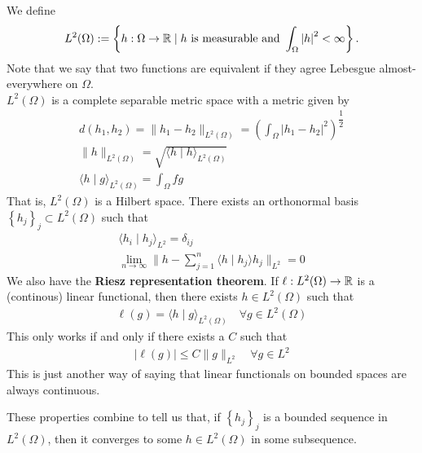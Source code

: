 \documentclass{memoir}
\begin{document}
\begin{rmrk}
	We define
	\begin{align*}
		L^2(\Omega ) := \left\{h: \Omega \to \mathbb{R} \mid h \text{ is measurable and } \int_\Omega \left| h \right|^2 < \infty\right\} .
	\end{align*}
	Note that we say that two functions are equivalent if they agree Lebesgue almost-everywhere on \(\Omega \).\\

	\(L^2(\Omega )\) is a complete separable metric space with a metric given by
	\begin{align*}
		d(h_1,h_2) = \|h_1 - h_2\|_{L^2(\Omega )} = \left( \int_\Omega \left| h_1 - h_2 \right|^2 \right)^{ \dfrac{1}{2}}\\
		\|h\|_{L^2(\Omega )} = \sqrt{ \langle h \mid h \rangle_{L^2(\Omega )}} \\
		\langle h \mid g \rangle_{L^2(\Omega )} = \int_\Omega fg
	\end{align*}
	That is, \(L^2(\Omega )\) is a Hilbert space. There exists an orthonormal basis \(\left\{ h_j \right\}_j \subset L^2(\Omega )\) such that
	\begin{align*}
		\langle h_i \mid h_j \rangle_{L^2} = \delta_{ij}\\
		\lim_{n \to \infty} \|h - \sum_{j=1}^{n} \langle h \mid h_j \rangle h_j\|_{L^2} = 0
	\end{align*}
	We also have the \textbf{Riesz representation theorem}. If \(\ell:L^2(\Omega ) \to \mathbb{R}\) is a (continous) linear functional, then there exists \(h \in L^2(\Omega )\) such that
	\begin{align*}
		\ell(g) = \langle h\mid g \rangle_{L^2(\Omega )} \quad \forall g \in L^2(\Omega )
	\end{align*}
	This only works if and only if there exists a \(C\) such that
	\begin{align*}
		\left| \ell(g) \right| \leq C \|g\|_{L^2}\quad \forall g \in L^2
	\end{align*}
	This is just another way of saying that linear functionals on bounded spaces are always continuous.
\end{rmrk}
	These properties combine to tell us that, if \(\left\{ h_j \right\}_j\) is a bounded sequence in \(L^2(\Omega )\), then it converges to some \(h \in L^2(\Omega )\) in some subsequence.\\
\end{document}
